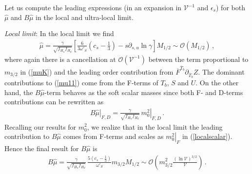 \documentclass[12pt,a4paper]{book}
\newcommand{\mc}{\mathcal}
\begin{document}
Let us compute the leading expressions (in an expansion in $\mathcal{V}^{-1}$ and $\epsilon_s$) for both $\hat\mu$ and $B\hat\mu$ in the local and ultra-local limit.

\medskip
\emph{Local limit}: In the local limit we find
\begin{align}
\hat\mu  =  \frac{\gamma}{\sqrt{f_{H_u } f_{H_d}}} \left[\frac{6}{3 \omega'_S} \left(c_s-\frac 13\right)
- s \partial_{s,u} \ln\gamma \right] M_{1/2}\sim\mc{O}\left(M_{1/2}\right)\,,
\label{mu11}
\end{align}
where again there is a cancellation at $\mc{O}(\mathcal{V}^{-1})$ between the term proportional to $m_{3/2}$ in (\ref{muK}) and the leading order contribution from $\overline{F}^{\overline{T}_b}\partial_{\overline{T}_b}Z$. The dominant contributions to (\ref{mu11}) come from the F-terms of $T_b$, $S$ and $U$. On the other hand, the $B\hat\mu$-term behaves as the soft scalar masses since both F- and D-terms contributions can be rewritten as
\begin{align}
\left.B\hat{\mu}\right|_{F,D} = \frac{\gamma}{\sqrt{f_{H_u} f_{H_d}}}\, \left.m_0^2\right|_{F,D}\,.
\label{bmu11}
\end{align}
Recalling our results for $m_0^2$, we realize that in the local limit the leading contribution to $B\hat\mu$ comes from F-terms and scales as $\left.m_0^2\right|_F$ in (\ref{localscalar}). Hence the final result for $B\hat\mu$ is
\begin{align}
B\hat{\mu} = \frac{\gamma}{\sqrt{f_{H_u} f_{H_d}}}\, \frac{5\left(c_s-\frac 13\right)}{\omega'_S} m_{3/2}M_{1/2}\sim \mc{O}\left(m_{3/2}^2\frac{\left(\ln\mathcal{V}\right)^{3/2}}{\mathcal{V}}\right)\,.
\label{bmu11local}
\end{align}
\end{document}
